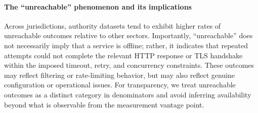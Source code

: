 \documentclass[a4paper,fleqn]{cas-sc}
\begin{document}
    \paragraph{The ``unreachable'' phenomenon and its implications}
    Across jurisdictions, authority datasets tend to exhibit higher rates of unreachable outcomes relative to other sectors. Importantly, ``unreachable'' does not necessarily imply that a service is offline; rather, it indicates that repeated attempts could not complete the relevant HTTP response or TLS handshake within the imposed timeout, retry, and concurrency constraints. These outcomes may reflect filtering or rate-limiting behavior, but may also reflect genuine configuration or operational issues. For transparency, we treat unreachable outcomes as a distinct category in denominators and avoid inferring availability beyond what is observable from the measurement vantage point.
\end{document}
